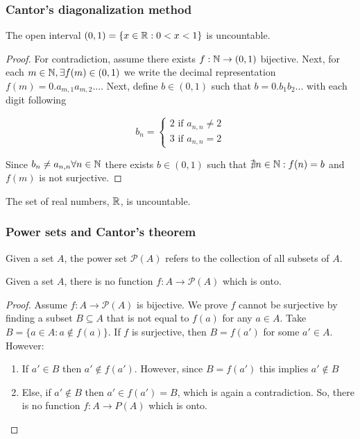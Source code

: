 \subsubsection{Cantor's diagonalization method}

\begin{theorem}
    The open interval $(0,1) = \{ x \in \mathbb{R}: 0 < x < 1 \}$ is uncountable.    
\end{theorem}

\begin{proof}
    For contradiction, assume there exists $f: \mathbb{N} \to (0,1)$ bijective. Next, for each $m \in \mathbb{N}, \exists f(m) \in (0,1)$ we write the decimal representation $f(m) = 0.a_{m,1}a_{m,2}...$. Next, define $b \in (0,1)$ such that $b = 0.b_1b_2...$ with each digit following

    \begin{equation}
        b_n = \begin{cases}
            2 \text{ if } a_{n,n} \ne 2 \\
            3 \text{ if } a_{n,n} = 2
        \end{cases}
    \end{equation}

    Since $b_n \neq a_{n,n} \forall n \in \mathbb{N}$ there exists $b \in (0,1)$ such that $\nexists n \in \mathbb{N}: f(n) = b$ and $f(m)$ is not surjective.
\end{proof}

\begin{corollary}
    The set of real numbers, $\mathbb{R}$, is uncountable.
\end{corollary}

\subsubsection{Power sets and Cantor's theorem}

Given a set $A$, the power set $\mathcal{P}(A)$ refers to the collection of all subsets of $A$.

\begin{theorem}
    Given a set $A$, there is no function $f: A \to \mathcal{P}(A)$ which is onto.    
\end{theorem}

\begin{proof}
    Assume $f: A \to \mathcal{P}(A)$ is bijective. We prove $f$ cannot be surjective by finding a subset $B \subseteq A$ that is not equal to $f(a)$ for any $a \in A$. Take $B = \{a \in A: a \notin f(a)\}$. If $f$ is surjective, then $B = f(a')$ for some $a' \in A$. However: \\
    \begin{enumerate}
        \item If $a' \in B$ then $a' \notin f(a')$. However, since $B = f(a')$ this implies $a' \notin B$
        \item Else, if $a' \notin B$ then $a' \in f(a') = B$, which is again a contradiction. So, there is no function $f: A \to P(A)$ which is onto.    
    \end{enumerate}
\end{proof}

